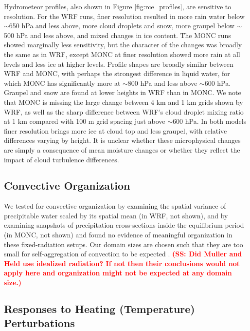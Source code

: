 \documentclass[draft]{agujournal2019}
\newcommand{\todo}[1]{\textcolor{red}{\textbf{(#1)}}}
\begin{document}
Hydrometeor profiles, also shown in Figure \ref{fig:rce_profiles}, are sensitive
to resolution. For the WRF runs, finer resolution resulted in more rain water
below $\sim$650 hPa and less above, more cloud droplets and snow, more graupel below $\sim$500 hPa and less above,
and mixed changes in ice content. The MONC runs showed marginally less
sensitivity, but the character of the changes was broadly the same as in WRF, except MONC at finer resolution showed
more rain at
all levels and less ice at
higher levels. Profile shapes are broadly similar between WRF and MONC, with
perhaps the strongest difference in liquid water, for which MONC has
significantly more at $\sim$800 hPa and less above $\sim$600 hPa. Graupel and
snow are found at lower heights in WRF than in MONC. We note that MONC
is missing the large change between 4 km and 1 km grids
shown by WRF, as well as the sharp difference between WRF's cloud droplet
mixing ratio at 1 km compared with 100 m grid spacing just above $\sim$600 hPa. In both models finer resolution brings more ice at cloud top and less graupel, with relative differences varying by height. It is unclear
whether these microphysical changes are simply a consequence of mean
moisture changes or whether they reflect the impact of cloud
turbulence differences.

\subsection{Convective Organization}

We tested for convective organization by examining the spatial variance of
precipitable water scaled by its spatial mean (in WRF, not shown), and by
examining snapshots of precipitation cross-sections inside the equilibrium
period (in MONC, not shown) and found no evidence of meaningful organization in
these fixed-radiation setups. Our domain sizes are chosen such that they are too
small for self-aggregation of convection to be expected \cite{Muller_JAS_2012}.
\todo{SS: Did Muller and Held use idealized radiation?  If not then their
conclusions would not apply here and organization might not be expected at any
domain size.}

\subsection{Responses to Heating (Temperature) Perturbations}
\end{document}
